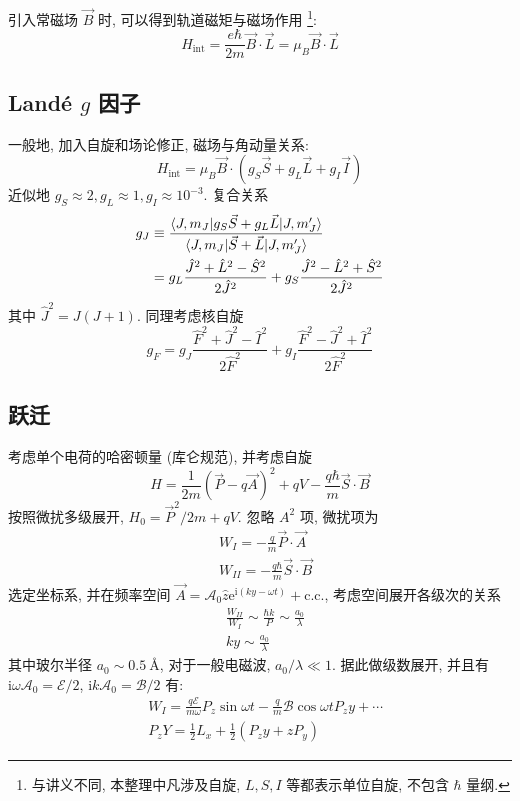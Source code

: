 \documentclass[10pt,a4paper,twocolumn]{article} %
\numberwithin{equation}{section} %
\newcommand\mi{\mathrm{i}}
\newcommand\e{\mathrm{e}} %
\newcommand\cc{\mathrm{c.c.}}
\begin{document}
引入常磁场 $\vec B$ 时, 可以得到轨道磁矩与磁场作用
\footnote{与讲义不同, 本整理中凡涉及自旋, $L, S, I$ 等都表示单位自旋, 不包含 $\hbar$ 量纲.}: 
\begin{equation}
	H_{\mathrm{int}} = \frac{e\hbar}{2m} \vec B\cdot\vec L 
	= \mu_B\vec B\cdot\vec L
\end{equation}
\subsection[Land\'e g 因子]{Land\'e $g$ 因子} %
\label{sub:lande_g_factor}
一般地, 加入自旋和场论修正, 磁场与角动量关系: 
\begin{equation}
	H_{\mathrm{int}} 
	= \mu_B\vec B\cdot(g_S\vec S + g_L\vec L + g_I\vec I)
\end{equation}
近似地 $g_S \approx 2, g_L \approx 1, g_I \approx 10^{-3}$. 复合关系
\begin{align}
	g_J &\equiv \frac{\braket{J, m_J|g_S \vec S + g_L \vec L|J, m_J'}}
	{\braket{J,m_J| \vec S + \vec L | J, m_J'}} \\
	& = g_L\frac{\hat J^2 + \hat L^2 -\hat S^2}{2\hat J^2} 
	+  g_S\frac{\hat J^2 - \hat L^2 +\hat S^2}{2\hat J^2} 
\end{align}
其中 $\hat J^2 = J(J+1)$. 
同理考虑核自旋
\begin{equation}
	g_F = g_J\frac{\hat F^2 + \hat J^2 -\hat I^2}{2\hat F^2} 
	+  g_I\frac{\hat F^2 - \hat J^2 +\hat I^2}{2\hat F^2} 
\end{equation}
\subsection{跃迁} %
\label{sub:transition}
考虑单个电荷的哈密顿量 (库仑规范), 并考虑自旋
\begin{equation}
	H = \frac{1}{2m}\left(\vec P - q\vec A\right)^2 + qV - 
	\frac {q\hbar}m\vec S\cdot\vec B
\end{equation}
按照微扰多级展开, $H_0 = \vec P^2/2m + qV$. 忽略 $A^2$ 项, 微扰项为
\begin{align}
	&W_I = -\frac{q}{m}\vec P\cdot\vec A \\
	&W_{II} = -\frac{q\hbar}{m}\vec S\cdot\vec B
\end{align}
选定坐标系, 并在频率空间 
$\vec A = \mathscr A_0\hat z\e^{\mi(ky - \omega t)}
+\cc$, 考虑空间展开各级次的关系
\begin{align}
	&\frac{W_{II}}{W_I} \sim \frac{\hbar k}{P}\sim \frac{a_0}{\lambda} \\
	&ky \sim\frac{a_0}{\lambda}
\end{align}
其中玻尔半径 $a_0\sim \SI{0.5}{\angstrom}$, 对于一般电磁波, $a_0/\lambda\ll 1$. 
据此做级数展开, 并且有 $\mi\omega\mathscr A_0 = \mathscr E/2$, 
$\mi k\mathscr A_0 = \mathscr B/2$ 有:
\begin{align}
	& W_I = \frac{q\mathscr E}{m\omega}P_z\sin\omega t - 
	\frac qm\mathscr B\cos\omega t P_z y + \cdots \\
	& P_z Y = \frac 12  L_x + \frac 12 \left(P_z y + z P_y\right)
\end{align}
\end{document}
